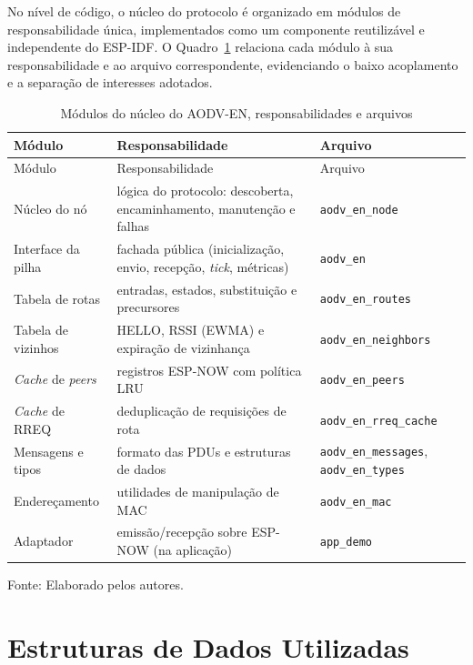 No nível de código, o núcleo do protocolo é organizado em módulos de
responsabilidade única, implementados como um componente reutilizável e
independente do ESP-IDF. O Quadro~\ref{quadro:modulos} relaciona cada
módulo à sua responsabilidade e ao arquivo correspondente, evidenciando
o baixo acoplamento e a separação de interesses adotados.

{\def\LTcaptype{quadro}
\begin{longtable}[]{@{}
  >{\raggedright\arraybackslash}p{}
  >{\raggedright\arraybackslash}p{}
  >{\raggedright\arraybackslash}p{}@{}}
\caption{Módulos do núcleo do AODV-EN, responsabilidades e arquivos}\label{quadro:modulos}\\
\toprule\noalign{}
Módulo & Responsabilidade & Arquivo \\
\midrule\noalign{}
\endfirsthead
\toprule\noalign{}
Módulo & Responsabilidade & Arquivo \\
\midrule\noalign{}
\endhead
\bottomrule\noalign{}
\endlastfoot
Núcleo do nó & lógica do protocolo: descoberta, encaminhamento, manutenção e falhas & \texttt{aodv\_en\_node} \\
Interface da pilha & fachada pública (inicialização, envio, recepção, \emph{tick}, métricas) & \texttt{aodv\_en} \\
Tabela de rotas & entradas, estados, substituição e precursores & \texttt{aodv\_en\_routes} \\
Tabela de vizinhos & HELLO, RSSI (EWMA) e expiração de vizinhança & \texttt{aodv\_en\_neighbors} \\
\emph{Cache} de \emph{peers} & registros ESP-NOW com política LRU & \texttt{aodv\_en\_peers} \\
\emph{Cache} de RREQ & deduplicação de requisições de rota & \texttt{aodv\_en\_rreq\_cache} \\
Mensagens e tipos & formato das PDUs e estruturas de dados & \texttt{aodv\_en\_messages}, \texttt{aodv\_en\_types} \\
Endereçamento & utilidades de manipulação de MAC & \texttt{aodv\_en\_mac} \\
Adaptador & emissão/recepção sobre ESP-NOW (na aplicação) & \texttt{app\_demo} \\
\end{longtable}
}

Fonte: Elaborado pelos autores.

\section{Estruturas de Dados
Utilizadas}\label{estruturas-de-dados-utilizadas}

